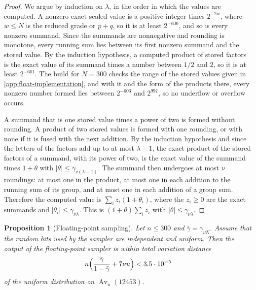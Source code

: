 \documentclass[11pt,reqno]{amsart}
\newtheorem{proposition}[proposition]{Proposition}
\theoremstyle{definition}
\theoremstyle{remark}
\newcommand{\Av}{\operatorname{Av}}
\begin{document}
\begin{proof}
We argue by induction on $\lambda$, in the order in which the values are
computed.  A nonzero exact scaled value is a positive integer times
$2^{-2w}$, where $w\leq N$ is the reduced grade or $p+q$, so it is at least $2^{-600}$, and so is every
nonzero summand.  Since the summands are nonnegative and rounding is
monotone, every running sum lies between its first nonzero summand and the
stored value.  By the induction hypothesis, a computed product of stored
factors is the exact value of its summand times a number between $1/2$ and
$2$, so it is at least $2^{-601}$.  The build for $N=300$
checks the range of the stored values given in
\cref{app:float-implementation}, and with it and the form of the products
there, every nonzero number formed lies between $2^{-603}$ and $2^{997}$, so
no underflow or overflow occurs.

A summand that is one stored value times a power of two is formed without
rounding.  A product of two stored values is formed with one rounding, or
with none if it is fused with the next addition.  By the induction hypothesis
and since the letters of the factors add up to at most $\lambda-1$, the
exact product of the stored factors of a summand, with its power of two, is
the exact value of the summand times $1+\theta$ with
$|\theta|\leq\gamma_{\nu(\lambda-1)}$.  The summand then
undergoes at most $\nu$ roundings: at most one in the product, at most
one in each addition to the running sum of its group, and at most one in
each addition of a group sum.  Therefore the computed value is
$\sum_i z_i(1+\theta_i)$, where the $z_i\geq0$ are the exact summands and
$|\theta_i|\leq\gamma_{\nu\lambda}$.  This is
$(1+\theta)\sum_i z_i$ with $|\theta|\leq\gamma_{\nu\lambda}$.
\end{proof}

\begin{proposition}[Floating-point sampling]\label{prop:float-sampling}
Let $n\leq300$ and $\bar\gamma=\gamma_{\nu N}$.  Assume that the random
bits used by the sampler are independent and uniform.  Then the output of
the floating-point sampler is within total variation distance
\[
 n\Bigl(\frac{\bar\gamma}{1-\bar\gamma}+7\nu u\Bigr)<3.5\cdot10^{-5}
\]
of the uniform distribution on $\Av_n(12453)$.
\end{proposition}
\end{document}
